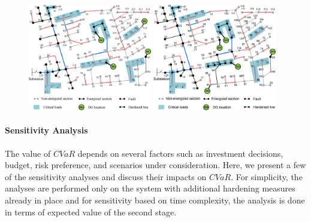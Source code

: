 \begin{figure}[ht]
        \centering
        {
        \includegraphics[width=0.48\textwidth]{figures/harden_neutral.eps}
    }\hfill
    {
        \includegraphics[width=0.48\textwidth]{figures/harden_averse.eps}  
     }
    \caption{}
    \label{fig:neutral_vs_averse_harden}
\end{figure}

\paragraph{Sensitivity Analysis}
The value of $CVaR$ depends on several factors such as investment decisions, budget, risk preference, and scenarios under consideration. Here, we present a few of the sensitivity analyses and discuss their impacts on $CVaR$. For simplicity, the analyses are performed only on the system with additional hardening measures already in place and for sensitivity based on time complexity, the analysis is done in terms of expected value of the second stage.

